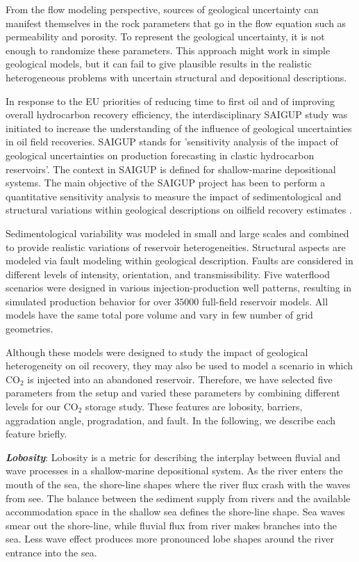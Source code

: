 From the flow modeling perspective, sources of geological uncertainty can
manifest themselves in the rock parameters that go in the flow equation such as
permeability and porosity. To represent the geological uncertainty, it is not
enough to randomize these parameters. This approach might work in simple
geological models, but it can fail to give plausible results in the realistic
heterogeneous problems with uncertain structural and depositional descriptions.

In response to the EU priorities of reducing time to first oil and of improving
overall hydrocarbon recovery efficiency, the interdisciplinary SAIGUP study was
initiated to increase the understanding of the influence of geological
uncertainties in oil field recoveries. SAIGUP stands for 'sensitivity analysis
of the impact of geological uncertainties on production forecasting in clastic
hydrocarbon reservoirs'. The context in SAIGUP is defined for shallow-marine
depositional systems. The main objective of the SAIGUP project has been to
perform a quantitative sensitivity analysis to measure the impact of
sedimentological and structural variations within geological descriptions on 
oilfield recovery estimates
\cite{howell2008sedimentological,manzocchi2008sensitivity,matthews2008assessing}
. 

Sedimentological variability was modeled in small and large scales and combined
to provide realistic variations of reservoir heterogeneities. Structural aspects
are modeled via fault modeling within geological description. Faults are
considered in different levels of intensity, orientation, and transmissibility.
Five waterflood scenarios were designed in various injection-production well
patterns, resulting in simulated production behavior for over $35000$ full-field
reservoir models. All models have the same total pore volume and vary in few
number of grid geometries. 

Although these models were designed to study the impact of geological
heterogeneity on oil recovery, they may also be used to model a scenario in
which $\mbox{CO}_2$ is injected into an abandoned reservoir. Therefore, we have
selected five parameters from the setup and varied these parameters by combining
different levels for our $\mbox{CO}_2$ storage study. These features are
lobosity, barriers, aggradation angle, progradation, and fault. In the
following, we describe each feature briefly.


\textbf{\textit{Lobosity}}: Lobosity is a metric for describing the interplay
between fluvial and wave processes in a shallow-marine depositional system. As
the river enters the mouth of the sea, the shore-line shapes where the river
flux crash with the waves from see. The balance between the sediment supply from
rivers and the available accommodation space in the shallow sea defines the
shore-line shape. Sea waves smear out the shore-line, while fluvial flux from
river makes branches into the sea. Less wave effect produces more pronounced
lobe shapes around the river entrance into the sea. 

